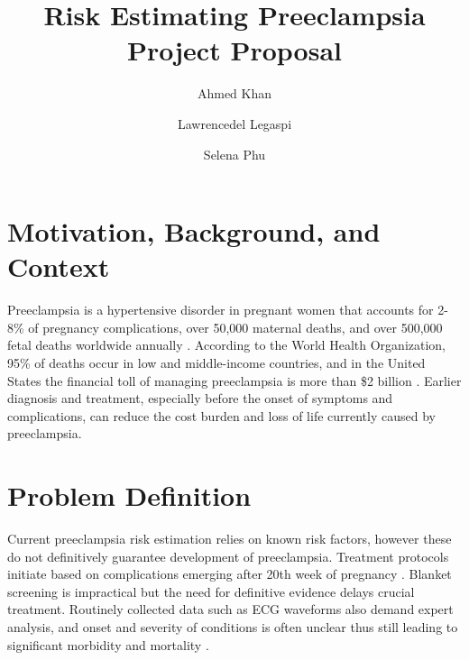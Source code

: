 \documentclass[sigconf,nonacm]{acmart}
\begin{document}
\title{Risk Estimating Preeclampsia Project Proposal}

\author{Ahmed Khan}

\author{Lawrencedel Legaspi}

\author{Selena Phu}

\begin{teaserfigure}
\centering
{}
\end{teaserfigure}
\maketitle

\section{Motivation, Background, and Context}
Preeclampsia is a hypertensive disorder in pregnant women that accounts for 2-8\% of pregnancy complications, over 50,000 maternal deaths, and over 500,000 fetal deaths worldwide annually \cite{nbk570611}. According to the World Health Organization, 95\% of deaths occur in low and middle-income countries, and in the United States the financial toll of managing preeclampsia is more than \$2 billion \cite{pmc12364110}. Earlier diagnosis and treatment, especially before the onset of symptoms and complications, can reduce the cost burden and loss of life currently caused by preeclampsia.

  \section{Problem Definition}
Current preeclampsia risk estimation relies on known risk factors, however these do not definitively guarantee development of preeclampsia. Treatment protocols initiate based on complications emerging after 20th week of pregnancy \cite{pmc12364110}. Blanket screening is impractical but the need for definitive evidence delays crucial treatment. Routinely collected data such as ECG waveforms also demand expert analysis, and onset and severity of conditions is often unclear thus still leading to significant morbidity and mortality \cite{pmc12364110}.
\end{document}

